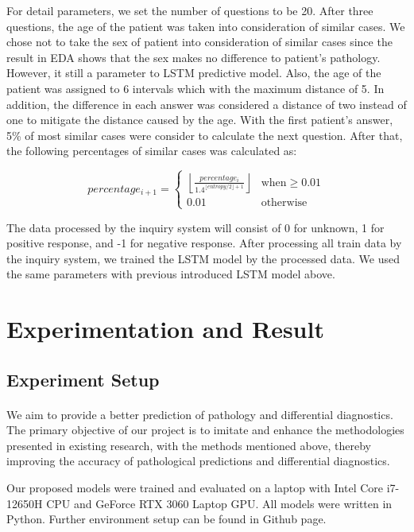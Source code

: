 \documentclass{article}
\begin{document}
For detail parameters, we set the number of questions to be 20. After three questions, the age of the patient was  taken into consideration of similar cases. We chose not to take the sex of patient into consideration of similar cases since the result in EDA shows that the sex makes no difference to patient's pathology. However, it still a parameter to LSTM predictive model. Also, the age of the patient was assigned to 6 intervals which with the maximum distance of 5. In addition, the difference in each answer was considered a distance of two instead of one to mitigate the distance caused by the age. With the first patient's answer, 5\% of most similar cases were consider to calculate the next question. After that, the following percentages of similar cases was calculated as:

\[
percentage_{i+1} = 
\begin{cases} 
\left\lfloor \frac{percentage_i}{1.4^{\lfloor entropy/2 \rfloor + 1}} \right\rfloor  & \text{when} \geq 0.01 \\
0.01 & \text{otherwise}
\end{cases}
\]

The data processed by the inquiry system will consist of 0 for unknown, 1 for positive response, and -1 for negative response.
After processing all train data by the inquiry system, we trained the LSTM model by the processed data. We used the same parameters with previous introduced LSTM model above.

\section{Experimentation and Result}
\subsection{Experiment Setup}
\paragraph{ }
We aim to provide a better prediction of pathology and differential diagnostics. The primary objective of our project is to imitate and enhance the methodologies presented in existing research, with the methods mentioned above, thereby improving the accuracy of pathological predictions and differential diagnostics.

Our proposed models were trained and evaluated on a laptop with Intel Core i7-12650H CPU and GeForce RTX 3060 Laptop GPU. All models were written in Python. Further environment setup can be found in Github page.
\end{document}
